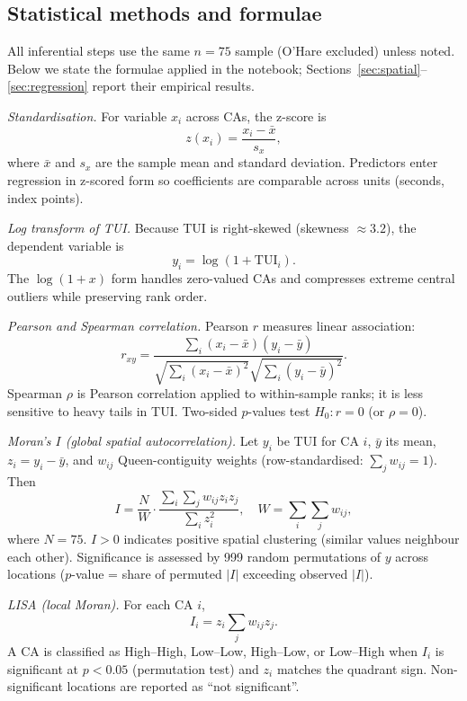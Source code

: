 \documentclass[10pt, a4paper]{article}
\begin{document}
\subsection{Statistical methods and formulae}\label{sec:methods}
All inferential steps use the same $n=75$ sample (O'Hare excluded) unless noted. Below we state the formulae applied in the notebook; Sections~\ref{sec:spatial}--\ref{sec:regression} report their empirical results.

\textit{Standardisation.} For variable $x_i$ across CAs, the z-score is
\begin{equation}
    z(x_i) = \frac{x_i - \bar{x}}{s_x},
\end{equation}
where $\bar{x}$ and $s_x$ are the sample mean and standard deviation. Predictors enter regression in z-scored form so coefficients are comparable across units (seconds, index points).

\textit{Log transform of TUI.} Because TUI is right-skewed (skewness $\approx 3.2$), the dependent variable is
\begin{equation}
    y_i = \log(1 + \mathrm{TUI}_i).
\end{equation}
The $\log(1+x)$ form handles zero-valued CAs and compresses extreme central outliers while preserving rank order.

\textit{Pearson and Spearman correlation.} Pearson $r$ measures linear association:
\begin{equation}
    r_{xy} = \frac{\sum_i (x_i - \bar{x})(y_i - \bar{y})}{\sqrt{\sum_i (x_i - \bar{x})^2}\sqrt{\sum_i (y_i - \bar{y})^2}}.
\end{equation}
Spearman $\rho$ is Pearson correlation applied to within-sample ranks; it is less sensitive to heavy tails in TUI. Two-sided $p$-values test $H_0\!: r=0$ (or $\rho=0$).

\textit{Moran's $I$ (global spatial autocorrelation).}\label{sec:spatial}
Let $y_i$ be TUI for CA $i$, $\bar{y}$ its mean, $z_i = y_i - \bar{y}$, and $w_{ij}$ Queen-contiguity weights (row-standardised: $\sum_j w_{ij}=1$). Then
\begin{equation}
    I = \frac{N}{W}\cdot\frac{\sum_i\sum_j w_{ij} z_i z_j}{\sum_i z_i^2}, \quad W = \sum_i\sum_j w_{ij},
\end{equation}
where $N=75$. $I>0$ indicates positive spatial clustering (similar values neighbour each other). Significance is assessed by 999 random permutations of $y$ across locations ($p$-value = share of permuted $|I|$ exceeding observed $|I|$).

\textit{LISA (local Moran).} For each CA $i$,
\begin{equation}
    I_i = z_i \sum_j w_{ij} z_j.
\end{equation}
A CA is classified as High--High, Low--Low, High--Low, or Low--High when $I_i$ is significant at $p<0.05$ (permutation test) and $z_i$ matches the quadrant sign. Non-significant locations are reported as ``not significant''.
\end{document}
